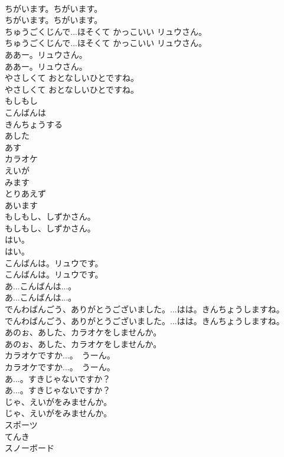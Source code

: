 \documentclass[8pt]{extreport}
\begin{document}
\begin{CJK}{UTF8}{min}
\\	ちがいます。ちがいます。	
\\	ちがいます。ちがいます。 
\\	ちゅうごくじんで...ほそくて かっこいい リュウさん。	
\\	ちゅうごくじんで...ほそくて かっこいい リュウさん。 
\\	ああー。リュウさん。	
\\	ああー。リュウさん。 
\\	やさしくて おとなしいひとですね。	
\\	やさしくて おとなしいひとですね。 
\\	もしもし
\\	こんばんは
\\	きんちょうする
\\	あした 
\\	あす
\\	カラオケ
\\	えいが
\\	みます
\\	とりあえず
\\	あいます
\\	もしもし、しずかさん。	
\\	もしもし、しずかさん。 
\\	はい。	
\\	はい。 
\\	こんばんは。リュウです。	
\\	こんばんは。リュウです。 
\\	あ...こんばんは...。	
\\	あ...こんばんは...。 
\\	でんわばんごう、ありがとうございました。...はは。きんちょうしますね。	
\\	でんわばんごう、ありがとうございました。...はは。きんちょうしますね。 
\\	あのぉ、あした、カラオケをしませんか。	
\\	あのぉ、あした、カラオケをしませんか。 
\\	カラオケですか...。　うーん。	
\\	カラオケですか...。　うーん。 
\\	あ...。すきじゃないですか？	
\\	あ...。すきじゃないですか？ 
\\	じゃ、えいがをみませんか。	
\\	じゃ、えいがをみませんか。 
\\	スポーツ
\\	てんき
\\	スノーボード

\end{CJK}
\end{document}
